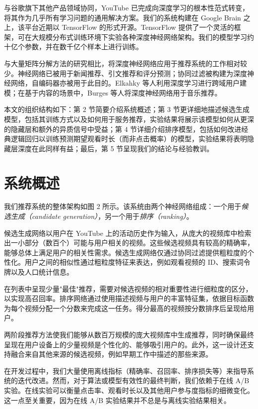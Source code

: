 与谷歌旗下其他产品领域协同，YouTube 已完成向深度学习的根本性范式转变，将其作为几乎所有学习问题的通用解决方案。我们的系统构建在 Google Brain 之上，该平台近期以 TensorFlow 的形式开源。TensorFlow 提供了一个灵活的框架，可在大规模分布式训练环境下实验各种深度神经网络架构。我们的模型学习约十亿个参数，并在数千亿个样本上进行训练。

与大量矩阵分解方法的研究相比，将深度神经网络应用于推荐系统的工作相对较少。神经网络已被用于新闻推荐、引文推荐和评分预测；协同过滤被构建为深度神经网络，自编码器亦被用于此目的。Elkahky 等人利用深度学习进行跨域用户建模；在基于内容的场景中，Burges 等人将深度神经网络用于音乐推荐。

本文的组织结构如下：第 2 节简要介绍系统概述；第 3 节更详细地描述候选生成模型，包括其训练方式以及如何用于服务推荐，实验结果将展示该模型如何从更深的隐藏层和额外的异质信号中受益；第 4 节详细介绍排序模型，包括如何改进经典逻辑回归以训练预测期望观看时长（而非点击概率）的模型，实验结果将表明隐藏层深度在此同样有益；最后，第 5 节呈现我们的结论与经验教训。

\section{系统概述}

我们推荐系统的整体架构如图 2 所示。该系统由两个神经网络组成：一个用于\textit{候选生成（candidate generation）}，另一个用于\textit{排序（ranking）}。

候选生成网络以用户在 YouTube 上的活动历史作为输入，从庞大的视频库中检索出一小部分（数百个）可能与用户相关的视频。这些候选视频具有较高的精确率，能够总体上满足用户的相关性需求。候选生成网络仅通过协同过滤提供粗粒度的个性化。用户之间的相似性通过粗粒度特征来表达，例如观看视频的 ID、搜索词令牌以及人口统计信息。

在列表中呈现少量"最佳"推荐，需要对候选视频的相对重要性进行细粒度的区分，以实现高召回率。排序网络通过使用描述视频与用户的丰富特征集，依据目标函数为每个视频分配一个分数来完成这一任务。得分最高的视频按分数排序后呈现给用户。

两阶段推荐方法使我们能够从数百万规模的庞大视频库中生成推荐，同时确保最终呈现在用户设备上的少量视频是个性化的、能够吸引用户的。此外，这一设计还支持融合来自其他来源的候选视频，例如早期工作中描述的那些来源。

在开发过程中，我们大量使用离线指标（精确率、召回率、排序损失等）来指导系统的迭代改进。然而，对于算法或模型有效性的最终判断，我们依赖于在线 A/B 实验。在线实验可以衡量点击率、观看时长以及其他用户参与度指标的细微变化。这一点至关重要，因为在线 A/B 实验结果并不总是与离线实验结果相关。

